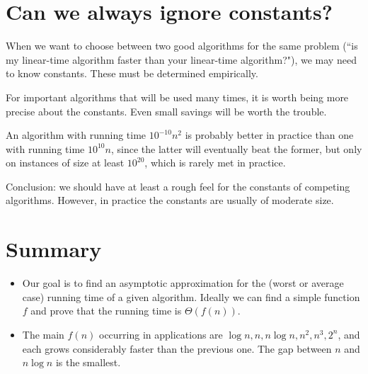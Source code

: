 \section*{Can we always ignore constants?}

When we want to choose between two good algorithms for the same
problem (``is my linear-time algorithm faster than your linear-time
algorithm?"), we may need to know constants. These must be determined
empirically. 

For important algorithms that will be used many times, it is worth
being more precise about the constants. Even small savings will be worth
the trouble. 

An algorithm with running time $10^{-10} n^2$ is probably better
in practice than one with running time $10^{10} n$, since the latter
will eventually beat the former, but only on instances of size at least $10^{20}$, 
which is rarely met in practice. 

Conclusion: we should have at least a rough feel for the constants
of competing algorithms. However, in practice the constants are usually
of moderate size. 



\section*{Summary}
\begin{itemize}
\item Our goal is to find an asymptotic approximation for the (worst or average 
case) running time of a given algorithm. Ideally we can find a simple function 
$f$ and prove that the running time is $\Theta(f(n))$.
\item The main $f(n)$ occurring in applications are $\log n, n, n \log n, n^2, n^3, 2^n$, and 
each grows considerably faster than the previous one. The gap between $n$ and 
$n\log n$ is the smallest.
\end{itemize}